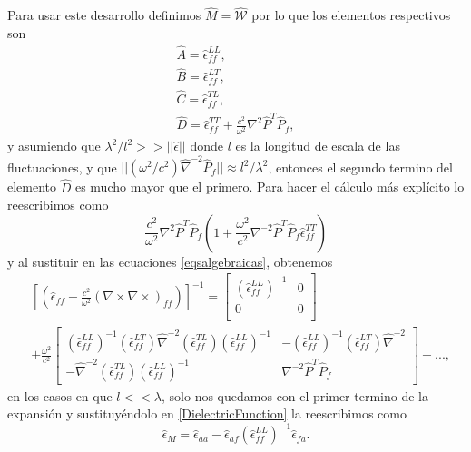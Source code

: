 \documentclass[12pt]{article}
\begin{document}
Para usar este desarrollo definimos $\hat{M} = \hat{\mathcal{W}}$ por
lo que los elementos respectivos son
\[
\begin{split}
  \hat{A} = \hat{\epsilon}_{ff}^{LL}, \\
  \hat{B} = \hat{\epsilon}_{ff}^{LT}, \\
  \hat{C} = \hat{\epsilon}_{ff}^{TL}, \\
  \hat{D} = \hat{\epsilon}_{ff}^{TT}+\frac{c^{2}}{\omega^{2}}\nabla ^{2}\hat{P}^{T}\hat{P}_{f},
\end{split}
\]
y asumiendo que $\lambda^{2}/l^{2} >> ||\hat{\epsilon}||$ donde $l$ es
la longitud de escala de las fluctuaciones, y que
$||(\omega^{2}/c^{2})\hat{\nabla}^{-2}\hat{P}_{f}||\approx
l^{2}/\lambda ^{2}$, entonces el segundo termino del elemento
$\hat{D}$ es mucho mayor que el primero. Para hacer el cálculo más
explícito lo reescribimos como
\[ \frac{c^{2}}{\omega^{2}}\nabla ^{2}\hat{P}^{T}\hat{P}_{f}(1+\frac{\omega^{2}}{c^{2}}\nabla ^{-2}\hat{P}^{T}\hat{P}_{f}\hat{\epsilon}_{ff}^{TT}) \]
y al sustituir en las ecuaciones \eqref{eqsalgebraicas}, obtenemos
\begin{equation}
  \begin{split}
    &\left[(\hat{\epsilon}_{ff}- \frac{c^{2}}{\omega^{2}}(\nabla \times
      \nabla \times)_{ff})\right]^{-1}  =
    \left[ \begin{array}{cc}
        (\hat{\epsilon}_{ff}^{LL})^{-1} & 0 \\ 0 & 0 \\
    \end{array}
      \right] \\ & + \frac{\omega^{2}}{c^{2}}\left[ \begin{array}{cc}
        (\hat{\epsilon}_{ff}^{LL})^{-1}(\hat{\epsilon}_{ff}^{LT})\hat{\nabla}^{-2}(\hat{\epsilon}_{ff}^{TL})(\hat{\epsilon}_{ff}^{LL})^{-1}
        &
        -(\hat{\epsilon}_{ff}^{LL})^{-1}(\hat{\epsilon}_{ff}^{LT})\hat{\nabla}^{-2}
        \\ -\hat{\nabla}^{-2}(\hat{\epsilon}_{ff}^{TL})(\hat{\epsilon}_{ff}^{LL})^{-1}
        & \nabla^{-2}\hat{P}^{T}\hat{P}_{f}
      \end{array} \right] + ...,
    \end{split}
\end{equation}
en los casos en que $l << \lambda $, solo nos quedamos con el primer
termino de la expansión y sustituyéndolo en \eqref{DielectricFunction}
la reescribimos como
\begin{equation}
  \hat{\epsilon}_{M}=\hat{\epsilon}_{aa}-\hat{\epsilon}_{af}(\hat{\epsilon}_{ff}^{LL})^{-1}\hat{\epsilon}_{fa}.
\end{equation}
\end{document}
